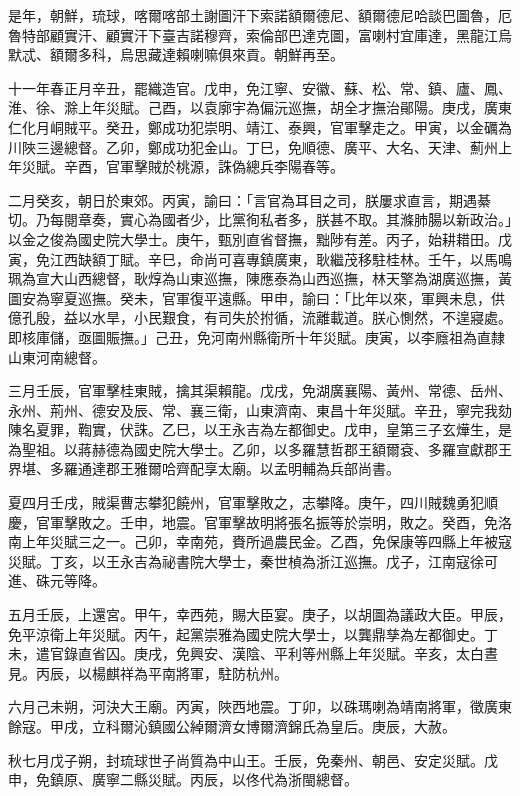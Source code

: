 \begin{pinyinscope}
是年，朝鮮，琉球，喀爾喀部土謝圖汗下索諾額爾德尼、額爾德尼哈談巴圖魯，厄魯特部顧實汗、顧實汗下臺吉諾穆齊，索倫部巴達克圖，富喇村宜庫達，黑龍江烏默忒、額爾多科，烏思藏達賴喇嘛俱來貢。朝鮮再至。

十一年春正月辛丑，罷織造官。戊申，免江寧、安徽、蘇、松、常、鎮、廬、鳳、淮、徐、滁上年災賦。己酉，以袁廓宇為偏沅巡撫，胡全才撫治鄖陽。庚戌，廣東仁化月峒賊平。癸丑，鄭成功犯崇明、靖江、泰興，官軍擊走之。甲寅，以金礪為川陜三邊總督。乙卯，鄭成功犯金山。丁巳，免順德、廣平、大名、天津、薊州上年災賦。辛酉，官軍擊賊於桃源，誅偽總兵李陽春等。

二月癸亥，朝日於東郊。丙寅，諭曰：「言官為耳目之司，朕屢求直言，期遇綦切。乃每閱章奏，實心為國者少，比黨徇私者多，朕甚不取。其滌肺腸以新政治。」以金之俊為國史院大學士。庚午，甄別直省督撫，黜陟有差。丙子，始耕耤田。戊寅，免江西缺額丁賦。辛巳，命尚可喜專鎮廣東，耿繼茂移駐桂林。壬午，以馬鳴珮為宣大山西總督，耿焞為山東巡撫，陳應泰為山西巡撫，林天擎為湖廣巡撫，黃圖安為寧夏巡撫。癸未，官軍復平遠縣。甲申，諭曰：「比年以來，軍興未息，供億孔殷，益以水旱，小民艱食，有司失於拊循，流離載道。朕心惻然，不遑寢處。即核庫儲，亟圖賑撫。」己丑，免河南州縣衛所十年災賦。庚寅，以李廕祖為直隸山東河南總督。

三月壬辰，官軍擊桂東賊，擒其渠賴龍。戊戌，免湖廣襄陽、黃州、常德、岳州、永州、荊州、德安及辰、常、襄三衛，山東濟南、東昌十年災賦。辛丑，寧完我劾陳名夏罪，鞫實，伏誅。乙巳，以王永吉為左都御史。戊申，皇第三子玄燁生，是為聖祖。以蔣赫德為國史院大學士。乙卯，以多羅慧哲郡王額爾袞、多羅宣獻郡王界堪、多羅通達郡王雅爾哈齊配享太廟。以孟明輔為兵部尚書。

夏四月壬戌，賊渠曹志攀犯饒州，官軍擊敗之，志攀降。庚午，四川賊魏勇犯順慶，官軍擊敗之。壬申，地震。官軍擊故明將張名振等於崇明，敗之。癸酉，免洛南上年災賦三之一。己卯，幸南苑，賚所過農民金。乙酉，免保康等四縣上年被寇災賦。丁亥，以王永吉為祕書院大學士，秦世楨為浙江巡撫。戊子，江南寇徐可進、硃元等降。

五月壬辰，上還宮。甲午，幸西苑，賜大臣宴。庚子，以胡圖為議政大臣。甲辰，免平涼衛上年災賦。丙午，起黨崇雅為國史院大學士，以龔鼎孳為左都御史。丁未，遣官錄直省囚。庚戌，免興安、漢陰、平利等州縣上年災賦。辛亥，太白晝見。丙辰，以楊麒祥為平南將軍，駐防杭州。

六月己未朔，河決大王廟。丙寅，陜西地震。丁卯，以硃瑪喇為靖南將軍，徵廣東餘寇。甲戌，立科爾沁鎮國公綽爾濟女博爾濟錦氏為皇后。庚辰，大赦。

秋七月戊子朔，封琉球世子尚質為中山王。壬辰，免秦州、朝邑、安定災賦。戊申，免鎮原、廣寧二縣災賦。丙辰，以佟代為浙閩總督。


\end{pinyinscope}
